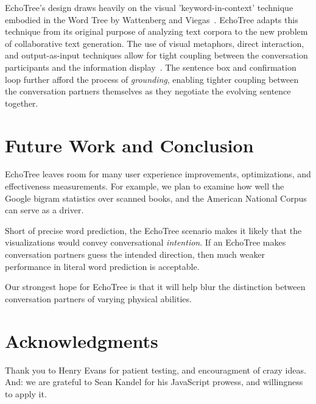 \documentclass{sigchi}
\begin{document}
EchoTree's design draws heavily on the visual 'keyword-in-context'
technique embodied in the Word Tree by Wattenberg and
Viegas~\cite{wattenberg2008}. EchoTree adapts this technique from its
original purpose of analyzing text corpora to the new problem of
collaborative text generation. The use of visual metaphors, direct
interaction, and output-as-input techniques allow for tight coupling
between the conversation participants and the information
display~\cite{Ahlberg1994}. The sentence box and confirmation loop
further afford the process of {\em grounding}, enabling tighter
coupling between the conversation partners themselves as they
negotiate the evolving sentence together.

\section{Future Work and Conclusion}
EchoTree leaves room for many user experience improvements,
optimizations, and effectiveness measurements. For example, we plan to
examine how well the Google bigram statistics over scanned books, and
the American National Corpus \cite{anc} can serve as a driver.

Short of precise word prediction, the EchoTree scenario makes it
likely that the visualizations would convey conversational {\em
  intention}. If an EchoTree makes conversation partners guess the
intended direction, then much weaker performance in literal word
prediction is acceptable.

Our strongest hope for EchoTree is that it will help blur the
distinction between conversation partners of varying physical
abilities. 

\section{Acknowledgments}
Thank you to Henry Evans for patient testing, and encouragment of
crazy ideas. And: we are grateful to Sean Kandel for his JavaScript
prowess, and willingness to apply it.


%
%
%
%
%
\balance


\scriptsize{}
\end{document}
